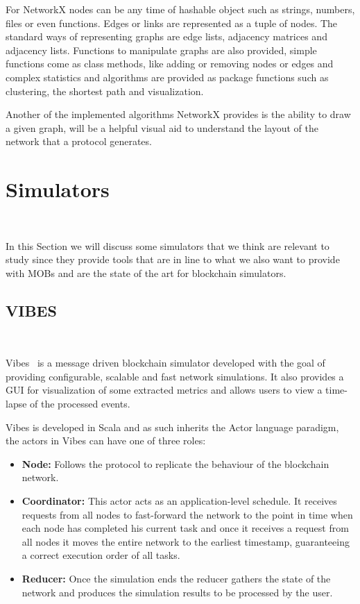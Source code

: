 For NetworkX nodes can be any time of hashable object such as strings, numbers,
files or even functions. Edges or links are represented as a tuple of nodes. The
standard ways of representing graphs are edge lists, adjacency matrices and adjacency
lists. Functions to manipulate graphs are also provided, simple functions come as class
methods, like adding or removing nodes or edges and complex statistics and algorithms
are provided as package functions such as clustering, the shortest path and visualization.

Another of the implemented algorithms NetworkX provides is the ability to draw
a given graph, will be a helpful visual aid to understand the layout of the network
that a protocol generates.

\section{Simulators}~\label{sec:simulators}

In this Section we will discuss some simulators that we think are relevant to study
since they provide tools that are in line to what we also want to provide with MOBs and
are the state of the art for blockchain simulators.

\subsection{VIBES}~\label{subsec:vibes}

Vibes~\cite{vibes} is a message driven blockchain simulator developed with the goal of providing
configurable, scalable and fast network simulations. It also provides a GUI for visualization
of some extracted metrics and allows users to view a time-lapse of the processed events.

Vibes is developed in Scala and as such inherits the Actor language paradigm, the actors in
Vibes can have one of three roles:

\begin{itemize}
  \item \textbf{Node:} Follows the protocol to replicate the behaviour of the blockchain
  network.
  \item \textbf{Coordinator:} This actor acts as an application-level schedule. It receives
  requests from all nodes to fast-forward the network to the point in time when each node
  has completed his current task and once it receives a request from all nodes it moves the
  entire network to the earliest timestamp, guaranteeing a correct execution order of all tasks.
  \item \textbf{Reducer:} Once the simulation ends the reducer gathers the state of the network
  and produces the simulation results to be processed by the user.
\end{itemize}

